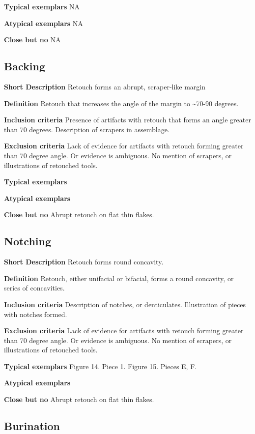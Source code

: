 \documentclass[
]{article}
\begin{document}
\textbf{Typical exemplars} NA

\textbf{Atypical exemplars} NA

\textbf{Close but no} NA

\hypertarget{backing}{%
\subsection{Backing}\label{backing}}

\textbf{Short Description} Retouch forms an abrupt, scraper-like margin

\textbf{Definition} Retouch that increases the angle of the margin to
\textasciitilde70-90 degrees.

\textbf{Inclusion criteria} Presence of artifacts with retouch that
forms an angle greater than 70 degrees. Description of scrapers in
assemblage.

\textbf{Exclusion criteria} Lack of evidence for artifacts with retouch
forming greater than 70 degree angle. Or evidence is ambiguous. No
mention of scrapers, or illustrations of retouched tools.

\textbf{Typical exemplars}

\textbf{Atypical exemplars}

\textbf{Close but no} Abrupt retouch on flat thin flakes.

\hypertarget{notching}{%
\subsection{Notching}\label{notching}}

\textbf{Short Description} Retouch forms round concavity.

\textbf{Definition} Retouch, either unifacial or bifacial, forms a round
concavity, or series of concavities.

\textbf{Inclusion criteria} Description of notches, or denticulates.
Illustration of pieces with notches formed.

\textbf{Exclusion criteria} Lack of evidence for artifacts with retouch
forming greater than 70 degree angle. Or evidence is ambiguous. No
mention of scrapers, or illustrations of retouched tools.

\textbf{Typical exemplars} Figure 14. Piece 1. Figure 15. Pieces E, F.

\textbf{Atypical exemplars}

\textbf{Close but no} Abrupt retouch on flat thin flakes.

\hypertarget{burination}{%
\subsection{Burination}\label{burination}}
\end{document}
